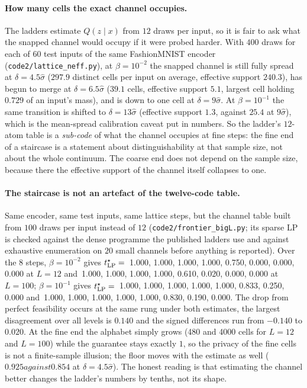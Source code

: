 \documentclass[11pt]{article}
\begin{document}
\paragraph{How many cells the exact channel occupies.}
The ladders estimate $Q(z\mid x)$ from $12$ draws per input, so it is fair to ask what the snapped
channel would occupy if it were probed harder. With $400$ draws for each of $60$ test inputs of the
same FashionMNIST encoder (\texttt{code2/lattice\_neff.py}), at $\beta=10^{-2}$ the snapped channel is
still fully spread at $\delta=4.5\hat\sigma$ ($297.9$ distinct cells per input on average, effective
support $240.3$), has begun to merge at $\delta=6.5\hat\sigma$ ($39.1$ cells, effective support $5.1$,
largest cell holding $0.729$ of an input's mass), and is down to one cell at $\delta=9\hat\sigma$. At
$\beta=10^{-1}$ the same transition is shifted to $\delta=13\hat\sigma$ (effective support $1.3$,
against $25.4$ at $9\hat\sigma$), which is the mean-spread calibration caveat put in numbers. So the
ladder's $12$-atom table is a \emph{sub-code} of what the channel occupies at fine steps: the fine end
of a staircase is a statement about distinguishability at that sample size, not about the whole
continuum. The coarse end does not depend on the sample size, because there the effective support of
the channel itself collapses to one.

\paragraph{The staircase is not an artefact of the twelve-code table.}
Same encoder, same test inputs, same lattice steps, but the channel table built from $100$ draws per
input instead of $12$ (\texttt{code2/frontier\_bigL.py}; its sparse LP is checked against the dense
programme the published ladders use and against exhaustive enumeration on $20$ small channels before
anything is reported). Over the $8$ steps, $\beta=10^{-2}$ gives $t^\star_{\rm LP}=$~1.000, 1.000, 1.000, 1.000, 0.750, 0.000, 0.000, 0.000 at
$L=12$ and~1.000, 1.000, 1.000, 1.000, 0.610, 0.020, 0.000, 0.000 at $L=100$; $\beta=10^{-1}$ gives $t^\star_{\rm LP}=$~1.000, 1.000, 1.000, 1.000, 1.000, 0.833, 0.250, 0.000 and~1.000, 1.000, 1.000, 1.000, 1.000, 0.830, 0.190, 0.000. The drop from
perfect feasibility occurs at the same rung under both estimates, the largest disagreement over all
levels is $0.140$ and the signed differences run from $-0.140$ to $0.020$. At the fine end the
alphabet simply grows (480 and 4000 cells for $L=12$ and $L=100$) while the guarantee stays exactly $1$,
so the privacy of the fine cells is not a finite-sample illusion; the floor moves with the estimate as
well ($0.925 against 0.854$ at $\delta=4.5\hat\sigma$). The honest reading is that estimating the channel better
changes the ladder's numbers by tenths, not its shape.
\end{document}
